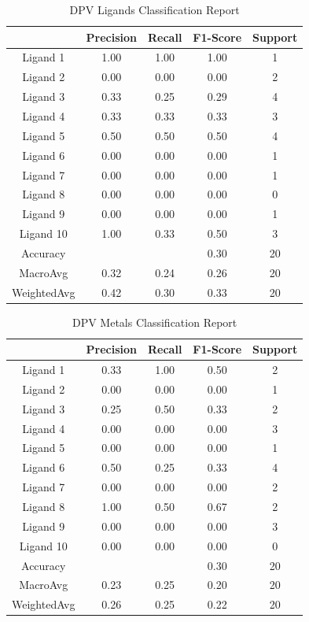 \begin{table}[!h]
\begin{center}
\begin{tabular}{c|c|c|c|c}
 & Precision & Recall & F1-Score & Support\\
\hline
Ligand 1 & 1.00 & 1.00 & 1.00 & 1\\
Ligand 2 & 0.00 & 0.00 & 0.00 & 2\\
Ligand 3 & 0.33 & 0.25 & 0.29 & 4\\
Ligand 4 & 0.33 & 0.33 & 0.33 & 3\\
Ligand 5 & 0.50 & 0.50 & 0.50 & 4\\
Ligand 6 & 0.00 & 0.00 & 0.00 & 1\\
Ligand 7 & 0.00 & 0.00 & 0.00 & 1\\
Ligand 8 & 0.00 & 0.00 & 0.00 & 0\\
Ligand 9 & 0.00 & 0.00 & 0.00 & 1\\
Ligand 10 & 1.00 & 0.33 & 0.50 & 3\\
\hline
Accuracy & & & 0.30 & 20\\
MacroAvg & 0.32 & 0.24 & 0.26 & 20\\
WeightedAvg & 0.42 & 0.30 & 0.33 & 20
\end{tabular}
\caption{DPV Ligands Classification Report}
\label{dpv_ligand_report}
\end{center}
\end{table}
\begin{table}[!h]
\begin{center}
\begin{tabular}{c|c|c|c|c}
 & Precision & Recall & F1-Score & Support\\
\hline
Ligand 1 & 0.33 & 1.00 & 0.50 & 2\\
Ligand 2 & 0.00 & 0.00 & 0.00 & 1\\
Ligand 3 & 0.25 & 0.50 & 0.33 & 2\\
Ligand 4 & 0.00 & 0.00 & 0.00 & 3\\
Ligand 5 & 0.00 & 0.00 & 0.00 & 1\\
Ligand 6 & 0.50 & 0.25 & 0.33 & 4\\
Ligand 7 & 0.00 & 0.00 & 0.00 & 2\\
Ligand 8 & 1.00 & 0.50 & 0.67 & 2\\
Ligand 9 & 0.00 & 0.00 & 0.00 & 3\\
Ligand 10 & 0.00 & 0.00 & 0.00 & 0\\
\hline
Accuracy & & & 0.30 & 20\\
MacroAvg & 0.23 & 0.25 & 0.20 & 20\\
WeightedAvg & 0.26 & 0.25 & 0.22 & 20
\end{tabular}
\caption{DPV Metals Classification Report}
\label{dpv_metal_report}
\end{center}
\end{table}
